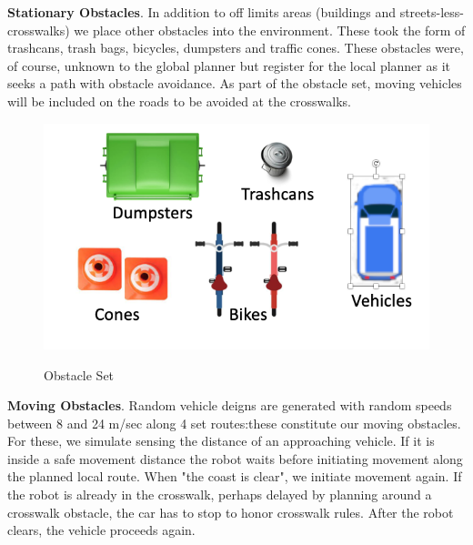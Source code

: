 \documentclass{article}
\begin{document}
\begin{multicols}{2}
\noindent \textbf{Stationary Obstacles}. In addition to off limits areas (buildings and streets-less-crosswalks) we place other obstacles into the environment.  These took the form of trashcans, trash bags, bicycles, dumpsters and traffic cones.  These obstacles were, of course, unknown to the global planner but register for the local planner as it seeks a path with obstacle avoidance.  As part of the obstacle set, moving vehicles will be included on the roads to be avoided at the crosswalks.
\begin{figure}[H]
   \centering
    \includegraphics[width = 1\columnwidth]{figures/obstacles.png}
     \label{fig:obstacles}
     \caption{Obstacle Set}
\end{figure}
\noindent \textbf{Moving Obstacles}. Random vehicle deigns are generated with random speeds between 8 and 24 m/sec along 4 set routes:these constitute our moving obstacles. For these, we simulate sensing the distance of an approaching vehicle.  If it is inside a safe movement distance the robot waits before initiating movement along the planned local route. When "the coast is clear", we initiate movement again.  If the robot is already in the crosswalk, perhaps delayed by planning around a crosswalk obstacle, the car has to stop to honor crosswalk rules.  After the robot clears, the vehicle proceeds again.\\


\end{multicols}
\end{document}

